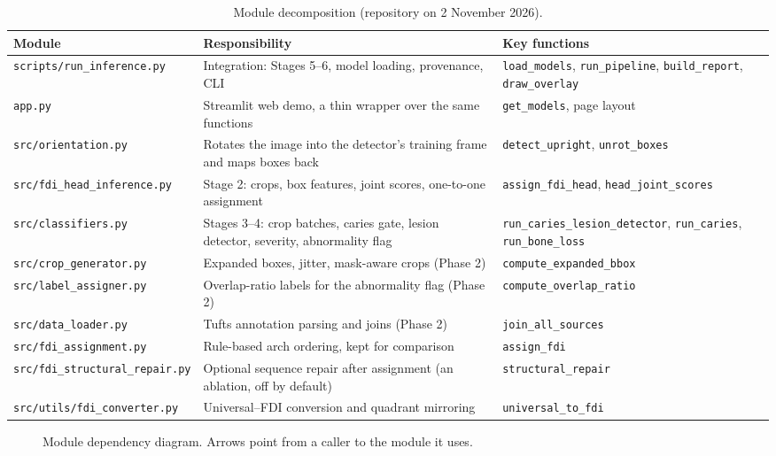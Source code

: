 \begin{table}[!htbp]
\centering
\caption[Module decomposition]{Module decomposition (repository on 2 November 2026).}
\label{tab:modules}
\small
\begin{tabularx}{\textwidth}{@{}L{4.4cm}YL{4.5cm}@{}}
\toprule
Module & Responsibility & Key functions\\
\midrule
\nolinkurl{scripts/run_inference.py} & Integration: Stages 5--6, model loading, provenance, CLI & \texttt{load\_models}, \texttt{run\_pipeline}, \texttt{build\_report}, \texttt{draw\_overlay}\\
\nolinkurl{app.py} & Streamlit web demo, a thin wrapper over the same functions & \texttt{get\_models}, page layout\\
\nolinkurl{src/orientation.py} & Rotates the image into the detector's training frame and maps boxes back & \texttt{detect\_upright}, \texttt{unrot\_boxes}\\
\nolinkurl{src/fdi_head_inference.py} & Stage 2: crops, box features, joint scores, one-to-one assignment & \texttt{assign\_fdi\_head}, \texttt{head\_joint\_scores}\\
\nolinkurl{src/classifiers.py} & Stages 3--4: crop batches, caries gate, lesion detector, severity, abnormality flag & \nolinkurl{run_caries_lesion_detector}, \texttt{run\_caries}, \texttt{run\_bone\_loss}\\
\nolinkurl{src/crop_generator.py} & Expanded boxes, jitter, mask-aware crops (Phase 2) & \texttt{compute\_expanded\_bbox}\\
\nolinkurl{src/label_assigner.py} & Overlap-ratio labels for the abnormality flag (Phase 2) & \texttt{compute\_overlap\_ratio}\\
\nolinkurl{src/data_loader.py} & Tufts annotation parsing and joins (Phase 2) & \texttt{join\_all\_sources}\\
\nolinkurl{src/fdi_assignment.py} & Rule-based arch ordering, kept for comparison & \texttt{assign\_fdi}\\
\nolinkurl{src/fdi_structural_repair.py} & Optional sequence repair after assignment (an ablation, off by default) & \texttt{structural\_repair}\\
\nolinkurl{src/utils/fdi_converter.py} & Universal--FDI conversion and quadrant mirroring & \texttt{universal\_to\_fdi}\\
\bottomrule
\end{tabularx}
\end{table}

\begin{figure}[!htbp]
\centering

\caption[Module dependency diagram]{Module dependency diagram. Arrows point from a caller to the
module it uses.}
\label{fig:modules}
\end{figure}

